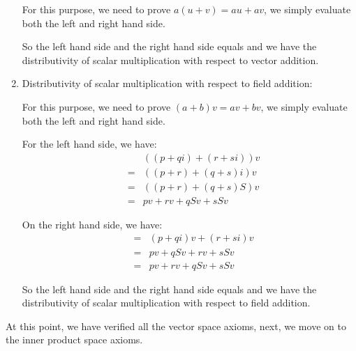 \begin{enumerate}
{        For this purpose, we need to prove $ a(u+v) = au + av $, we simply evaluate both the left and right hand side.
        
        So the left hand side and the right hand side equals and we have the distributivity of scalar multiplication with respect to vector addition.
    }
    \item {
        Distributivity of scalar multiplication with respect to field addition:

        For this purpose, we need to prove $ (a + b)v = av + bv $, we simply evaluate both the left and right hand side.

        For the left hand side, we have:
        \begin{eqnarray*}
          & & ((p+qi)+(r+si))v \\
          &=& ((p+r)+(q+s)i)v \\
          &=& ((p+r)+(q+s)S)v \\
          &=& pv+rv+qSv+sSv
        \end{eqnarray*}

        On the right hand side, we have:
        \begin{eqnarray*}
          &=& (p+qi)v + (r+si)v  \\
          &=& pv+qSv+rv+sSv \\
          &=& pv+rv+qSv+sSv
        \end{eqnarray*}

        So the left hand side and the right hand side equals and we have the distributivity of scalar multiplication with respect to field addition.
    }
\end{enumerate}
At this point, we have verified all the vector space axioms, next, we move on to the inner product space axioms.

